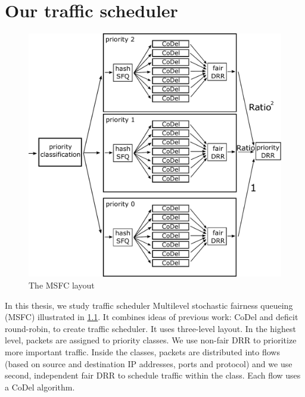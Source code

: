 \chapter{Our traffic scheduler}
\label{chap02}



\begin{figure}
	\centering
	\includegraphics[width=137mm]{drawings/msfc}
	\caption{The MSFC layout}
	\label{fig10:msfc}
\end{figure}

In this thesis, we study traffic scheduler Multilevel stochastic fairness queueing (MSFC) illustrated in \ref{fig10:msfc}. It combines ideas of previous work: CoDel and deficit round-robin, to create traffic scheduler. It uses three-level layout. In the highest level, packets are assigned to priority classes. We use non-fair DRR to prioritize more important traffic. Inside the classes, packets are distributed into flows (based on source and destination IP addresses, ports and protocol) and we use second, independent fair DRR to schedule traffic within the class. Each flow uses a CoDel algorithm.

